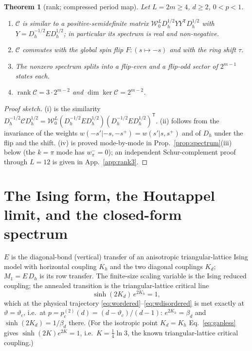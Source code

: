 \documentclass[11pt]{article}
\newtheorem{theorem}{Theorem}
\newcommand{\pctwo}{p_c^{(2)}}
\newcommand{\vth}{\vartheta}
\newcommand{\Ccomp}{\mathcal{C}}
\newcommand{\Wz}{\mathcal{W}_0}
\begin{document}
\begin{theorem}[rank; compressed period map]\label{thm:rank}
Let $L=2m\ge4$, $d\ge2$, $0<p<1$.
\begin{enumerate}
\item[(i)] $\Ccomp$ \emph{is similar to a positive-semidefinite matrix}
      $\Wz^L D_h^{1/2}YY^{\mathsf T}D_h^{1/2}$ with
      $Y=D_h^{-1/2}ED_h^{1/2}$; in particular its spectrum is real and
      non-negative.
\item[(ii)] $\Ccomp$ commutes with the global spin flip
      $F:(s\mapsto-s)$ and with the ring shift $\tau$.
\item[(iii)] The nonzero spectrum splits into a flip-even and a flip-odd
      sector of $2^{m-1}$ states each.
\item[(iv)] $\operatorname{rank}\Ccomp=3\cdot2^{m-2}$ and
      $\dim\ker\Ccomp=2^{m-2}$.
\end{enumerate}
\end{theorem}

\begin{proof}[Proof sketch]
(i) is the similarity $D_h^{-1/2}\Ccomp D_h^{1/2}
=\Wz^L(D_h^{-1/2}ED_h^{1/2})(D_h^{-1/2}ED_h^{1/2})^{\mathsf T}$.
(ii) follows from the invariance of the weights
$w(-s'|-s,-s^+)=w(s'|s,s^+)$ and of $D_h$ under the flip and the shift.
(iv) is proved mode-by-mode in Prop.~\ref{prop:spectrum}(iii) below (the
$k=\pi$ mode has $w_\pi^-=0$); an independent Schur-complement proof through
$L=12$ is given in App.~\ref{app:rank3}.
\end{proof}

\section{The Ising form, the Houtappel limit, and the closed-form spectrum}
\label{sec:ising}

$E$ is the diagonal-bond (vertical) transfer of an anisotropic
triangular-lattice Ising model with horizontal coupling $K_h$ and the two
diagonal couplings $K_d$; $M_1=E\,D_h$ is its row transfer.  The
finite-size scaling variable is the Ising reduced coupling; the annealed
transition is the triangular-lattice critical line
\begin{equation}
  \sinh(2K_d)\,e^{2K_h}=1,
  \label{eq:gapless}
\end{equation}
which at the physical trajectory \eqref{eq:wordered}--\eqref{eq:wdisordered}
is met exactly at $\vth=\vth_c$, i.e.\ at
$p=\pctwo(d)=(d-\vth_c)/(d-1)$: $e^{2K_h}=\beta_d$ and $\sinh(2K_d)=1/\beta_d$
there.  (For the isotropic point $K_d=K_h$ Eq.~\eqref{eq:gapless} gives
$\sinh(2K)e^{2K}=1$, i.e.\ $K=\tfrac14\ln3$, the known triangular-lattice
critical coupling.)
\end{document}
